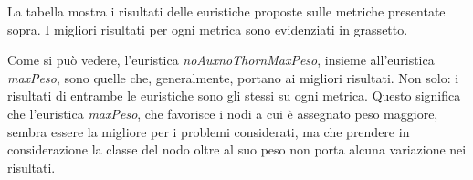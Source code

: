 La tabella mostra i risultati delle euristiche proposte sulle metriche presentate sopra. I migliori risultati per ogni metrica sono evidenziati in grassetto. 

Come si può vedere, l'euristica \textit{noAuxnoThornMaxPeso}, insieme all'euristica \textit{maxPeso}, sono quelle che, generalmente, portano ai migliori risultati. Non solo: i risultati di entrambe le euristiche sono gli stessi su ogni metrica. Questo significa che l'euristica \textit{maxPeso}, che favorisce i nodi a cui è assegnato peso maggiore, sembra essere la migliore per i problemi considerati, ma che prendere in considerazione la classe del nodo oltre al suo peso non porta alcuna variazione nei risultati.



